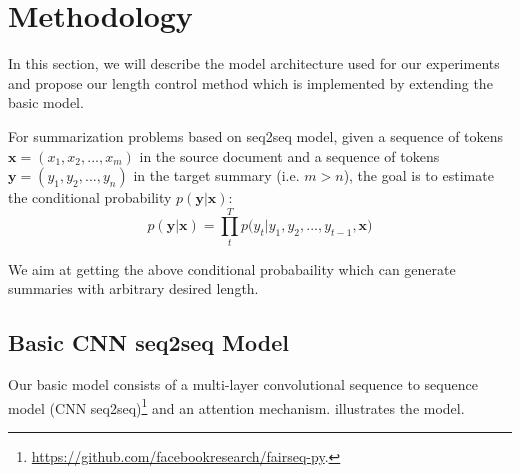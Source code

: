 \section{Methodology}
\label{sec:approach}

In this section, we will describe the model architecture used for our experiments
and propose our length control method which is implemented by extending the 
basic model.

For summarization problems based on seq2seq model, 
given a sequence of tokens $\textbf{x} = (x_{1},x_{2},...,x_{m})$ in the
source document and a sequence of tokens
$\textbf{y} = (y_{1}, y_{2},..., y_{n})$ in the target summary (i.e. $m>n$),
the goal is to estimate the conditional probability
$p(\textbf{y}|\textbf{x})$:
\begin{equation}
p(\textbf{y} | \textbf{x}) \!=\! {\prod^T_{t} {p(y_{t} | y_{1}, y_{2},..., y_{t-1}, \textbf{x}})}
\end{equation}

We aim at getting the above conditional probabaility which can generate
summaries with arbitrary desired length.

\subsection{Basic CNN seq2seq Model}
Our basic model consists of a multi-layer convolutional sequence to sequence model (CNN seq2seq)\footnote{\url{https://github.com/facebookresearch/fairseq-py}.} \cite{gehring2017convs2s,CunBDHHHJ89}
and an attention mechanism. %
 illustrates the model.

